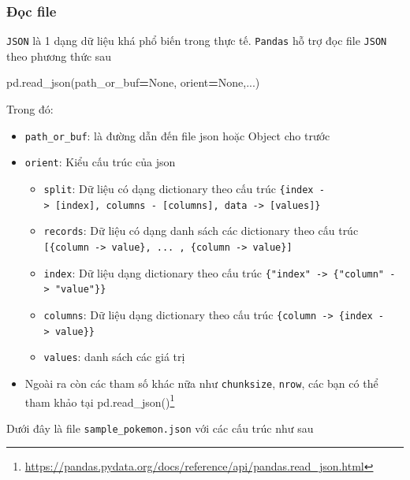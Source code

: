 \documentclass[
]{book}
\newenvironment{Shaded}{\begin{snugshade}}{\end{snugshade}}
\newcommand{\NormalTok}[1]{#1}
\newcommand{\OperatorTok}[1]{\textcolor[rgb]{0.81,0.36,0.00}{\textbf{#1}}}
\newcommand{\VariableTok}[1]{\textcolor[rgb]{0.00,0.00,0.00}{#1}}
\providecommand{\tightlist}{%
  \setlength{\itemsep}{0pt}\setlength{\parskip}{0pt}}
\renewcommand{\href}[2]{#2\footnote{\url{#1}}}
\begin{document}
\subsubsection{Đọc file}\label{ux111ux1ecdc-file-1}

\texttt{JSON} là 1 dạng dữ liệu khá phổ biến trong thực tế. \texttt{Pandas} hỗ trợ đọc file \texttt{JSON} theo phương thức sau

\begin{Shaded}
\begin{Highlighting}[]
\NormalTok{pd.read\_json(path\_or\_buf}\OperatorTok{=}\VariableTok{None}\NormalTok{, orient}\OperatorTok{=}\VariableTok{None}\NormalTok{,...)}
\end{Highlighting}
\end{Shaded}

Trong đó:

\begin{itemize}
\item
  \texttt{path\_or\_buf}: là đường dẫn đến file json hoặc Object cho trước
\item
  \texttt{orient}: Kiểu cấu trúc của json

  \begin{itemize}
  \tightlist
  \item
    \texttt{split}: Dữ liệu có dạng dictionary theo cấu trúc \texttt{\{index\ -\textgreater{}\ {[}index{]},\ columns\ -\ {[}columns{]},\ data\ -\textgreater{}\ {[}values{]}\}}
  \item
    \texttt{records}: Dữ liệu có dạng danh sách các dictionary theo cấu trúc \texttt{{[}\{column\ -\textgreater{}\ value\},\ ...\ ,\ \{column\ -\textgreater{}\ value\}{]}}
  \item
    \texttt{index}: Dữ liệu dạng dictionary theo cấu trúc \texttt{\{"index"\ -\textgreater{}\ \{"column"\ -\textgreater{}\ "value"\}\}}
  \item
    \texttt{columns}: Dữ liệu dạng dictionary theo cấu trúc \texttt{\{column\ -\textgreater{}\ \{index\ -\textgreater{}\ value\}\}}
  \item
    \texttt{values}: danh sách các giá trị
  \end{itemize}
\item
  Ngoài ra còn các tham số khác nữa như \texttt{chunksize}, \texttt{nrow}, các bạn có thể tham khảo tại \href{https://pandas.pydata.org/docs/reference/api/pandas.read_json.html}{pd.read\_json()}
\end{itemize}

Dưới đây là file \texttt{sample\_pokemon.json} với các cấu trúc như sau
\end{document}
